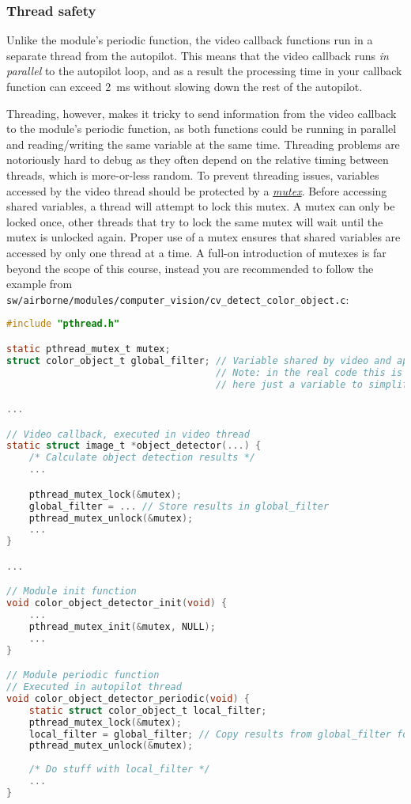 \documentclass{article}
\begin{document}
\subsubsection{Thread safety}
Unlike the module's periodic function, the video callback functions run in a separate thread from the autopilot. This means that the video callback runs \emph{in parallel} to the autopilot loop, and as a result the processing time in your callback function can exceed 2~ms without slowing down the rest of the autopilot.

Threading, however, makes it tricky to send information from the video callback to the module's periodic function, as both functions could be running in parallel and reading/writing the same variable at the same time. Threading problems are notoriously hard to debug as they often depend on the relative timing between threads, which is more-or-less random.
To prevent threading issues, variables accessed by the video thread should be protected by a \href{https://www.geeksforgeeks.org/mutex-lock-for-linux-thread-synchronization/}{\emph{mutex}}. Before accessing shared variables, a thread will attempt to lock this mutex. A mutex can only be locked once, other threads that try to lock the same mutex will wait until the mutex is unlocked again. Proper use of a mutex ensures that shared variables are accessed by only one thread at a time.
A full-on introduction of mutexes is far beyond the scope of this course, instead you are recommended to follow the example from \texttt{sw/airborne/modules/computer\_vision/cv\_detect\_color\_object.c}:
\begin{lstlisting}[language=c]
#include "pthread.h"

static pthread_mutex_t mutex;
struct color_object_t global_filter; // Variable shared by video and ap thread
                                     // Note: in the real code this is an array,
                                     // here just a variable to simplify this example.

...

// Video callback, executed in video thread
static struct image_t *object_detector(...) {
	/* Calculate object detection results */
	...

	pthread_mutex_lock(&mutex);
	global_filter = ... // Store results in global_filter
	pthread_mutex_unlock(&mutex);
	...
}

...

// Module init function
void color_object_detector_init(void) {
	...
	pthread_mutex_init(&mutex, NULL);
	...
}

// Module periodic function
// Executed in autopilot thread
void color_object_detector_periodic(void) {
	static struct color_object_t local_filter;
	pthread_mutex_lock(&mutex);
	local_filter = global_filter; // Copy results from global_filter for processing
	pthread_mutex_unlock(&mutex);
	
	/* Do stuff with local_filter */
	...
}
\end{lstlisting}
\end{document}
